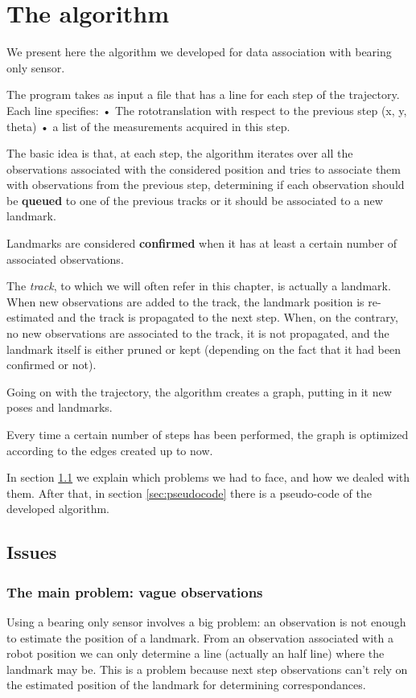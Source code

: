 \chapter{The algorithm}\label{cap:Algorithm}
We present here the algorithm we developed for data association with bearing only sensor.

The program takes as input a file that has a line for each step of the trajectory.
Each line specifies:
• The rototranslation with respect to the previous step (x, y, theta)
• a list of the measurements acquired in this step.

The basic idea is that, at each step, the algorithm iterates over all the observations associated with the considered position and tries to associate them with observations from the previous step, determining if each observation should be \textbf{queued} to one of the previous tracks or it should be associated to a new landmark.

Landmarks are considered \textbf{confirmed} when it has at least a certain number of associated observations.

The \textit{track}, to which we will often refer in this chapter, is actually a landmark. When new observations are added to the track, the landmark position is re-estimated and the track is propagated to the next step.
When, on the contrary, no new observations are associated to the track, it is not propagated, and the landmark itself is either pruned or kept (depending on the fact that it had been confirmed or not).

Going on with the trajectory, the algorithm creates a graph, putting in it new poses and landmarks.

Every time a certain number of steps has been performed, the graph is optimized according to the edges created up to now.

In section \ref{sec:issues} we explain which problems we had to face, and how we dealed with them.
After that, in section \ref{sec:pseudocode} there is a pseudo-code of the developed algorithm.

\section{Issues}\label{sec:issues}
\subsection{The main problem: vague observations}
Using a bearing only sensor involves a big problem: an observation is not enough to estimate the position of a landmark.
From an observation associated with a robot position we can only determine a line (actually an half line) where the landmark may be.
This is a problem because next step observations can't rely on the estimated position of the landmark for determining correspondances.

